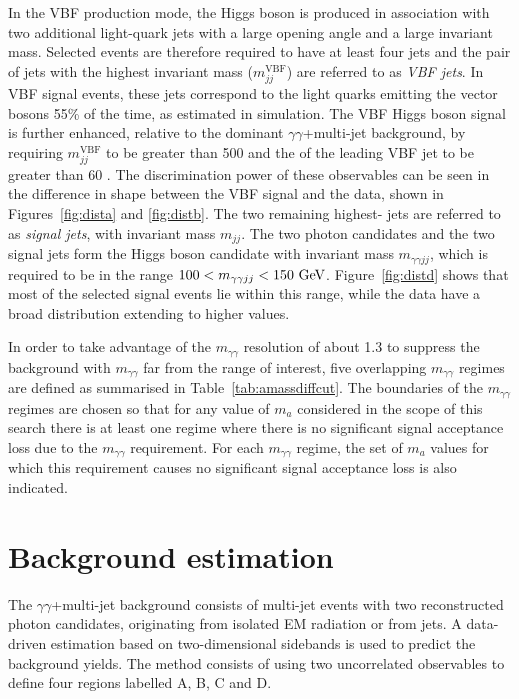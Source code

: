 In the VBF production mode, the Higgs boson is produced in association with two additional light-quark jets
with a large opening angle and a large invariant mass.
Selected events are therefore required to have at least four jets and 
the pair of jets with the highest invariant mass ($m_{jj}^\text{VBF}$) are referred to as \textit{VBF jets}.
In VBF signal events, these jets correspond to the light quarks emitting the vector bosons 55\% of the time, 
as estimated in simulation.
The VBF Higgs boson signal is further enhanced,
relative to the dominant $\gamma\gamma$+multi-jet background,
by requiring $m_{jj}^\text{VBF}$ to be greater than 500 \GeV{} and 
the \pt{} of the leading VBF jet to be greater than 60 \GeV{}.
The discrimination power of these observables can be seen in the difference in shape between the VBF signal and the 
data, shown in Figures~\ref{fig:dista} and \ref{fig:distb}.
The two remaining highest-\pt{} jets are referred to as \textit{signal jets}, with invariant mass $m_{jj}$.
The two photon candidates and the two signal jets form the Higgs boson candidate with invariant mass $m_{\gamma\gamma jj}$, 
which is required to be in the range $100 < m_{\gamma\gamma jj} < 150~\mathrm{GeV}{}$. 
Figure~\ref{fig:distd} shows that most of the selected signal events lie within this range, 
while the data have a broad distribution extending to higher values.

In order to take advantage of the $m_{\gamma\gamma}$ resolution of about 1.3 \GeV{} to suppress the background with $m_{\gamma\gamma}$ far from the
range of interest, five overlapping $m_{\gamma\gamma}$ regimes are defined as summarised in Table~\ref{tab:amassdiffcut}.
The boundaries of the $m_{\gamma\gamma}$ regimes are chosen so that for any value of $m_a$ 
considered in the scope of this search there is at least one regime where there is no significant signal acceptance loss
due to the $m_{\gamma\gamma}$ requirement.
For each $m_{\gamma\gamma}$ regime, the set of $m_a$ values for which this requirement causes no significant signal acceptance loss is also indicated.

\section{Background estimation}

The $\gamma\gamma$+multi-jet background consists of multi-jet events with two reconstructed photon candidates, 
originating from isolated EM radiation or from jets.
A data-driven estimation based on two-dimensional sidebands is used to predict the background yields.
The method consists of using two uncorrelated observables
to define four regions labelled A, B, C and D.

